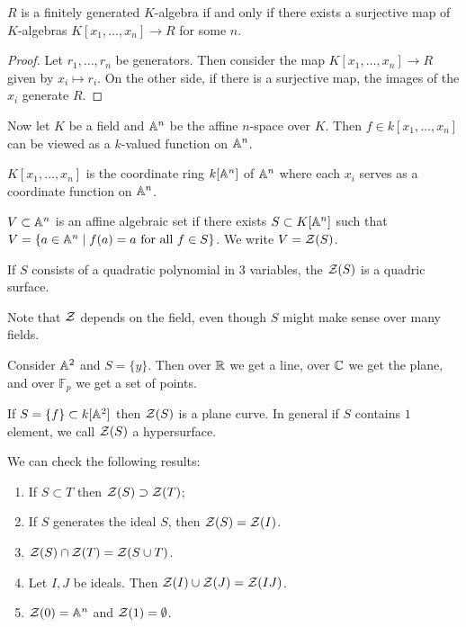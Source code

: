 \documentclass[10pt, twoside]{article}
\newcommand{\F}{\mathbb{F}}
\begin{document}
        \begin{prop}
            $R$ is a finitely generated $K$-algebra if and only if there exists a surjective map of 
            $K$-algebras $K[x_1, \ldots, x_n] \to R$ for some $n$.
            \begin{proof}
                Let $r_1, \ldots, r_n$ be generators. Then consider the map $K[x_1, \ldots, x_n] \to R$ given by $x_i \mapsto r_i$. On the other side, if there is a surjective map, the images of the $x_i$ generate $R$.
            \end{proof}
        \end{prop}

        Now let $K$ be a field and $\mathbb{A}^n$ be the affine $n$-space over $K$. Then $f \in k[x_1, \ldots, x_n]$ can be viewed as a $k$-valued function on $\mathbb{A}^n$.
        \begin{defn}
            $K[x_1, \ldots, x_n]$ is the coordinate ring $k[\mathbb{A}^n]$ of $\mathbb{A}^n$ where each $x_i$ serves as a coordinate function on $\mathbb{A}^n$.
        \end{defn}

        \begin{defn}
            $V \subset \mathbb{A}^n$ is an affine algebraic set if there exists $S \subset K[\mathbb{A}^n]$ such that $V = \{a \in \mathbb{A}^n \mid f(a) = a \text{ for all } f \in S \}$. We write $V = \mathcal{Z}(S)$.
        \end{defn}

        \begin{exm}
            If $S$ consists of a quadratic polynomial in $3$ variables, the $\mathcal{Z}(S)$ is a quadric surface.
        \end{exm}

        Note that $\mathcal{Z}$ depends on the field, even though $S$ might make sense over many fields.
        \begin{exm}
            Consider $\mathbb{A}^2$ and $S = \{y\}$. Then over $\mathbb{R}$ we get a line, over $\mathbb{C}$ we get the plane, and over $\F_p$ we get a set of points.
        \end{exm}

        \begin{exm}
            If $S = \{f\} \subset k[\mathbb{A}^2]$ then $\mathcal{Z}(S)$ is a plane curve. In general if $S$ contains $1$ element, we call $\mathcal{Z}(S)$ a hypersurface.
        \end{exm}

        We can check the following results:
        \begin{enumerate}
            \item If $S \subset T$ then $\mathcal{Z}(S) \supset \mathcal{Z}(T)$;
            \item If $S$ generates the ideal $S$, then $\mathcal{Z}(S) = \mathcal{Z}(I)$.
            \item $\mathcal{Z}(S) \cap \mathcal{Z}(T) = \mathcal{Z}(S \cup T)$.
            \item Let $I,J$ be ideals. Then $\mathcal{Z}(I) \cup \mathcal{Z}(J) = \mathcal{Z}(IJ)$.
            \item $\mathcal{Z}(0) = \mathbb{A}^n$ and $\mathcal{Z}(1) = \emptyset$.
        \end{enumerate}
\end{document}
